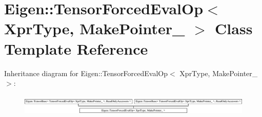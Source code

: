 \hypertarget{class_eigen_1_1_tensor_forced_eval_op}{}\section{Eigen\+:\+:Tensor\+Forced\+Eval\+Op$<$ Xpr\+Type, Make\+Pointer\+\_\+ $>$ Class Template Reference}
\label{class_eigen_1_1_tensor_forced_eval_op}
Inheritance diagram for Eigen\+:\+:Tensor\+Forced\+Eval\+Op$<$ Xpr\+Type, Make\+Pointer\+\_\+ $>$\+:\begin{figure}[H]
\begin{center}
\leavevmode
\includegraphics[height=1.007194cm]{class_eigen_1_1_tensor_forced_eval_op}
\end{center}
\end{figure}
